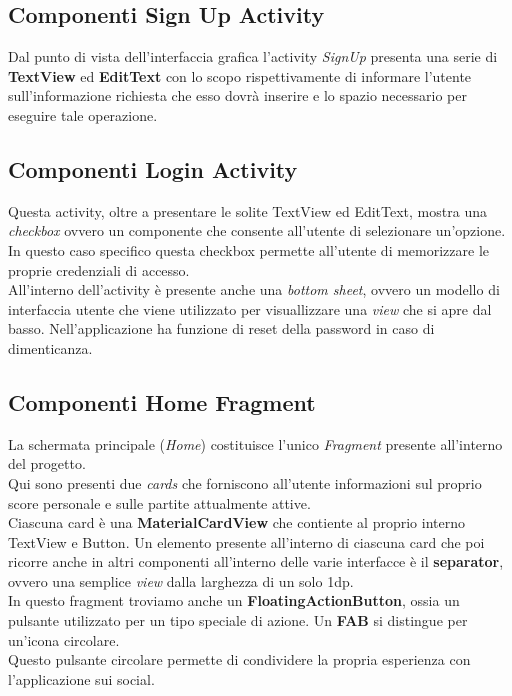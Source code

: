 \documentclass[a4paper,11pt,twoside,openright]{report}
\begin{document}
\subsection{Componenti Sign Up Activity}
Dal punto di vista dell'interfaccia grafica l'activity \textit{SignUp} presenta una serie di \textbf{TextView} ed \textbf{EditText} con lo scopo rispettivamente di informare l'utente sull'informazione richiesta che esso dovrà inserire e lo spazio necessario per eseguire tale operazione.

\subsection{Componenti Login Activity}
Questa activity, oltre a presentare le solite TextView ed EditText, mostra una \textit{checkbox} ovvero un componente che consente all'utente di selezionare un'opzione. In questo caso specifico  questa checkbox permette all'utente di memorizzare le proprie credenziali di accesso.\\
All'interno dell'activity è presente anche una \textit{bottom sheet}, ovvero un modello di interfaccia utente che viene utilizzato per visuallizzare una \textit{view} che si apre dal basso. Nell'applicazione ha funzione di reset della password in caso di dimenticanza.

\subsection{Componenti Home Fragment}
La schermata principale (\textit{Home}) costituisce l'unico \textit{Fragment} presente all'interno del progetto.\\
Qui sono presenti due \textit{cards} che forniscono all'utente informazioni sul proprio score personale e sulle partite attualmente attive.\\
Ciascuna card è una \textbf{MaterialCardView} che contiente al proprio interno TextView e Button. Un elemento presente all'interno di ciascuna card che poi ricorre anche in altri componenti all'interno delle varie interfacce è il \textbf{separator}, ovvero una semplice \textit{view} dalla larghezza di un solo 1dp.\\
In questo fragment troviamo anche un \textbf{FloatingActionButton}\cite{12}, ossia un pulsante utilizzato per un tipo speciale di azione. Un \textbf{FAB} si distingue per un'icona circolare.\\
Questo pulsante circolare permette di condividere la propria esperienza con l'applicazione sui social.\\
\end{document}
